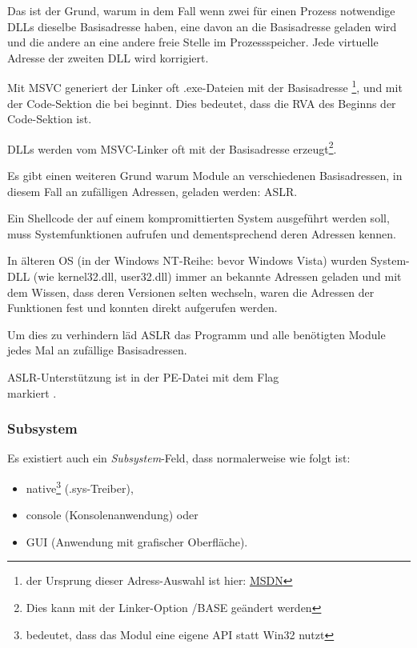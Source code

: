 Das ist der Grund, warum in dem Fall wenn zwei für einen Prozess notwendige DLLs
dieselbe Basisadresse haben, eine davon an die Basisadresse geladen wird und die
andere an eine andere freie Stelle im Prozessspeicher. Jede virtuelle Adresse der
zweiten DLL wird korrigiert.

\par Mit \ac{MSVC} generiert der Linker oft .exe-Dateien mit der Basisadresse
\footnote{der Ursprung dieser Adress-Auswahl ist hier: \href{http://blogs.msdn.com/b/oldnewthing/archive/2014/10/03/10562176.aspx}{MSDN}},
und mit der Code-Sektion die bei  beginnt.
Dies bedeutet, dass die \ac{RVA} des Beginns der Code-Sektion  ist.

DLLs werden vom MSVC-Linker oft mit der Basisadresse 
erzeugt\footnote{Dies kann mit der Linker-Option /BASE geändert werden}.


Es gibt einen weiteren Grund warum Module an verschiedenen Basisadressen, in diesem
Fall an zufälligen Adressen, geladen werden: \ac{ASLR}.


Ein Shellcode der auf einem kompromittierten System ausgeführt werden soll, muss
Systemfunktionen aufrufen und dementsprechend deren Adressen kennen.

In älteren \ac{OS} (in der \gls{Windows NT}-Reihe: bevor Windows Vista) wurden
System-DLL (wie kernel32.dll, user32.dll) immer an bekannte Adressen geladen und
mit dem Wissen, dass deren Versionen selten wechseln, waren die Adressen der Funktionen
fest und konnten direkt aufgerufen werden.

Um dies zu verhindern läd \ac{ASLR} das Programm und alle benötigten Module jedes
Mal an zufällige Basisadressen.

\ac{ASLR}-Unterstützung ist in der PE-Datei mit dem Flag\\
 markiert .

\subsubsection{Subsystem}

Es existiert auch ein \emph{Subsystem}-Feld, dass normalerweise wie folgt ist:


\begin{itemize}
\item native\footnote{bedeutet, dass das Modul eine eigene API statt Win32 nutzt} (.sys-Treiber),

\item console (Konsolenanwendung) oder

\item \ac{GUI} (Anwendung mit grafischer Oberfläche).
\end{itemize}

